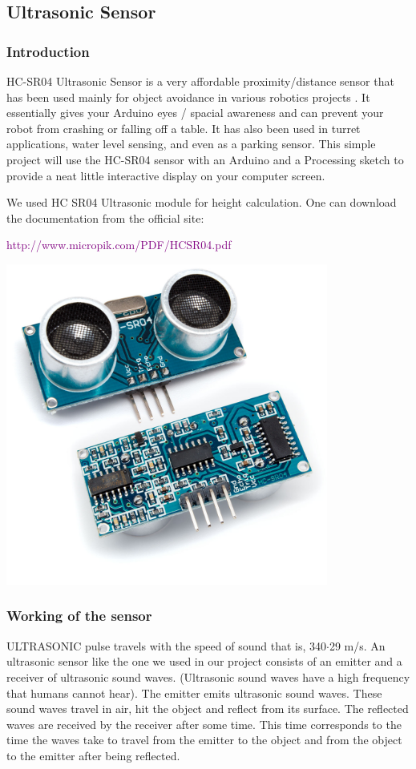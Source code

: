 \documentclass[a4paper,12pt]{article}
\begin{document}
\subsection{Ultrasonic Sensor}

\subsubsection*{Introduction}
HC-SR04 Ultrasonic Sensor is a very affordable proximity/distance sensor that has been used mainly for object 
avoidance in various robotics projects . It essentially gives your Arduino eyes / spacial awareness and can prevent your robot 
from crashing or falling off a table. It has also been used in turret applications, water level sensing, and even as a parking sensor. 
This simple project will use the HC-SR04 sensor with an Arduino and a Processing sketch to provide a neat little interactive display 
on your computer screen.

We used HC SR04 Ultrasonic module for height calculation. One can download the documentation from the official site:

\textcolor{purple}{http://www.micropik.com/PDF/HCSR04.pdf}

\includegraphics[width=300pt]{ultrasonic} 

\subsubsection*{Working of the sensor}
ULTRASONIC pulse travels with the speed of sound that is, 340$\cdot$29 m/s. An ultrasonic sensor like the one we used in our project consists
of an emitter and a receiver of ultrasonic sound waves. (Ultrasonic sound waves have a high frequency that humans cannot hear). The 
emitter emits ultrasonic sound waves. These sound waves travel in air, hit the object and reflect from its surface. The reflected 
waves are received by the receiver after some time. This time corresponds to the time the waves take to travel from the emitter to the 
object and from the object to the emitter after being reflected. 
\end{document}
